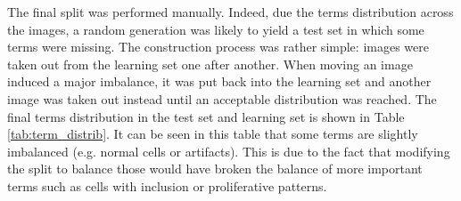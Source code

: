 The final split was performed manually. Indeed, due the terms distribution across the images, a random generation was likely to yield a test set in which some terms were missing. The construction process was rather simple: images were taken out from the learning set one after another. When moving an image induced a major imbalance, it was put back into the learning set and another image was taken out instead until an acceptable distribution was reached. The final terms distribution in the test set and learning set is shown in Table \ref{tab:term_distrib}. It can be seen in this table that some terms are slightly imbalanced (e.g. normal cells or artifacts). This is due to the fact that modifying the split to balance those would have broken the balance of more important terms such as cells with inclusion or proliferative patterns. 

